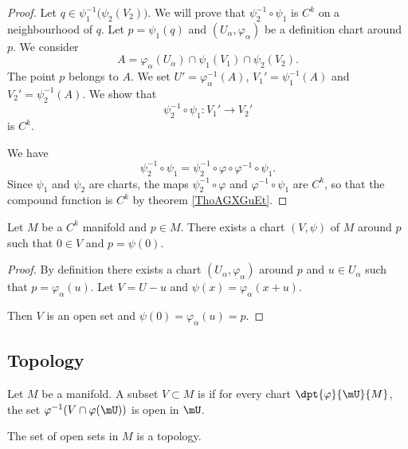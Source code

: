 \begin{proof}
    Let \( q\in \psi_1^{-1}\big( \psi_2(V_2) \big)\). We will prove that \( \psi_2^{-1}\circ\psi_1\) is \( C^k\) on a neighbourhood of \( q\).  Let \( p=\psi_1(q)\) and \( (U_{\alpha},\varphi_{\alpha})\) be a definition chart around \( p\). We consider
    \begin{equation}
        A=\varphi_{\alpha}(U_{\alpha})\cap\psi_1(V_1)\cap\psi_2(V_2).
    \end{equation}
    The point \( p\) belongs to \( A\). We set \( U'=\varphi_{\alpha}^{-1}(A)\), \( V_1'=\psi_1^{-1}(A)\) and \( V_2'=\psi_2^{-1}(A)\). We show that
    \begin{equation}
        \psi_2^{-1}\circ\psi_1\colon V_1'\to V_2'
    \end{equation}
    is \( C^k\).

    We have
    \begin{equation}
        \psi_2^{-1}\circ\psi_1=\psi_2^{-1}\circ\varphi\circ\varphi^{-1}\circ\psi_1.
    \end{equation}
    Since \( \psi_1\) and \( \psi_2\) are charts, the maps \( \psi_2^{-1}\circ \varphi\) and \( \varphi^{-1}\circ\psi_1\) are \( C^k\), so that the compound function is \( C^k\) by theorem \ref{ThoAGXGuEt}.
\end{proof}

\begin{lemma}       \label{LEMooOPPJooXezOHS}
    Let \( M\) be a \( C^k\) manifold and \( p\in M\). There exists a chart \( (V,\psi)\) of \( M\) around \( p\) such that \( 0\in V\) and \( p=\psi(0)\).
\end{lemma}

\begin{proof}
    By definition there exists a chart \( (U_{\alpha},\varphi_{\alpha})\) around \( p\) and \( u\in U_{\alpha}\) such that \( p=\varphi_{\alpha}(u)\). Let \( V=U-u\) and \( \psi(x)=\varphi_{\alpha}(x+u)\).

    Then \( V\) is an open set and \( \psi(0)=\varphi_{\alpha}(u)=p\).
\end{proof}

\subsection{Topology}

\begin{propositionDef}      \label{DEFooHGNOooNqGmxE}
    Let \( M\) be a manifold. A subset $V\subset M$ is  if for every chart $\dpt{\varphi}{\mU}{M}$, the set $\varphi^{-1}(V\cap\varphi(\mU))$ is open in $\mU$. 

    The set of open sets in \( M\) is a topology.
\end{propositionDef}

